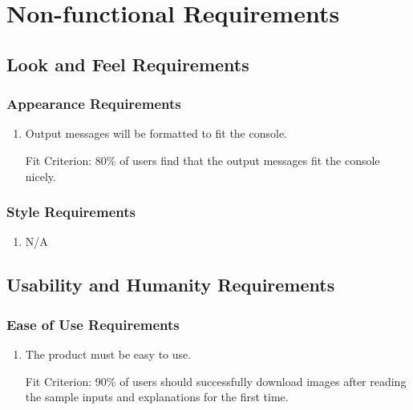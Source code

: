 \documentclass[12pt, titlepage]{article}
\begin{document}
\section{Non-functional Requirements}

\subsection{Look and Feel Requirements}

\subsubsection{Appearance Requirements}

\begin{enumerate}[label=AR\arabic*:, wide=0pt, leftmargin=*]
    \item Output messages will be formatted to fit the console.
    \item [Fit Criterion:] 80\% of users find that the output messages fit the console nicely. 
\end{enumerate}

\color{red}

\subsubsection{Style Requirements}

\begin{enumerate}[label=STR\arabic*:, wide=0pt, leftmargin=*]
    \item N/A
\end{enumerate}

\color{black}

\subsection{Usability and Humanity Requirements}

\subsubsection{Ease of Use Requirements}

\begin{enumerate}[label=EUR\arabic*:, wide=0pt, leftmargin=*]
    \item The product must be easy to use.
    \item [Fit Criterion:] 90\% of users should successfully download images after reading the sample inputs and explanations for the first time.
\end{enumerate}
\end{document}
